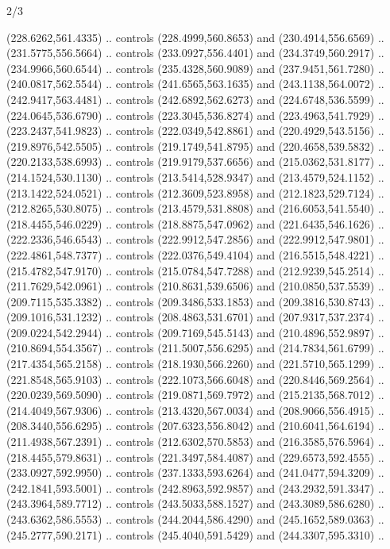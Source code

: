 \begin{flagdescription}{2/3}
\begin{scope}[shift={(0.5\flaglength,0.5)},scale=\flagwidth/545]
\begin{scope}[y=0.80pt, x=0.80pt, yscale=-1,shift={(-297,-430)}]
\begin{scope}[shift={(28.51887,-25.61095)}]
  (228.6262,561.4335) .. controls (228.4999,560.8653) and (230.4914,556.6569) ..
  (231.5775,556.5664) .. controls (233.0927,556.4401) and (234.3749,560.2917) ..
  (234.9966,560.6544) .. controls (235.4328,560.9089) and (237.9451,561.7280) ..
  (240.0817,562.5544) .. controls (241.6565,563.1635) and (243.1138,564.0072) ..
  (242.9417,563.4481) .. controls (242.6892,562.6273) and (224.6748,536.5599) ..
  (224.0645,536.6790) .. controls (223.3045,536.8274) and (223.4963,541.7929) ..
  (223.2437,541.9823) .. controls (222.0349,542.8861) and (220.4929,543.5156) ..
  (219.8976,542.5505) .. controls (219.1749,541.8795) and (220.4658,539.5832) ..
  (220.2133,538.6993) .. controls (219.9179,537.6656) and (215.0362,531.8177) ..
  (214.1524,530.1130) .. controls (213.5414,528.9347) and (213.4579,524.1152) ..
  (213.1422,524.0521) .. controls (212.3609,523.8958) and (212.1823,529.7124) ..
  (212.8265,530.8075) .. controls (213.4579,531.8808) and (216.6053,541.5540) ..
  (218.4455,546.0229) .. controls (218.8875,547.0962) and (221.6435,546.1626) ..
  (222.2336,546.6543) .. controls (222.9912,547.2856) and (222.9912,547.9801) ..
  (222.4861,548.7377) .. controls (222.0376,549.4104) and (216.5515,548.4221) ..
  (215.4782,547.9170) .. controls (215.0784,547.7288) and (212.9239,545.2514) ..
  (211.7629,542.0961) .. controls (210.8631,539.6506) and (210.0850,537.5539) ..
  (209.7115,535.3382) .. controls (209.3486,533.1853) and (209.3816,530.8743) ..
  (209.1016,531.1232) .. controls (208.4863,531.6701) and (207.9317,537.2374) ..
  (209.0224,542.2944) .. controls (209.7169,545.5143) and (210.4896,552.9897) ..
  (210.8694,554.3567) .. controls (211.5007,556.6295) and (214.7834,561.6799) ..
  (217.4354,565.2158) .. controls (218.1930,566.2260) and (221.5710,565.1299) ..
  (221.8548,565.9103) .. controls (222.1073,566.6048) and (220.8446,569.2564) ..
  (220.0239,569.5090) .. controls (219.0871,569.7972) and (215.2135,568.7012) ..
  (214.4049,567.9306) .. controls (213.4320,567.0034) and (208.9066,556.4915) ..
  (208.3440,556.6295) .. controls (207.6323,556.8042) and (210.6041,564.6194) ..
  (211.4938,567.2391) .. controls (212.6302,570.5853) and (216.3585,576.5964) ..
  (218.4455,579.8631) .. controls (221.3497,584.4087) and (229.6573,592.4555) ..
  (233.0927,592.9950) .. controls (237.1333,593.6264) and (241.0477,594.3209) ..
  (242.1841,593.5001) .. controls (242.8963,592.9857) and (243.2932,591.3347) ..
  (243.3964,589.7712) .. controls (243.5033,588.1527) and (243.3089,586.6280) ..
  (243.6362,586.5553) .. controls (244.2044,586.4290) and (245.1652,589.0363) ..
  (245.2777,590.2171) .. controls (245.4040,591.5429) and (244.3307,595.3310) ..

\end{scope}
\end{scope}
\end{scope}
\end{flagdescription}
